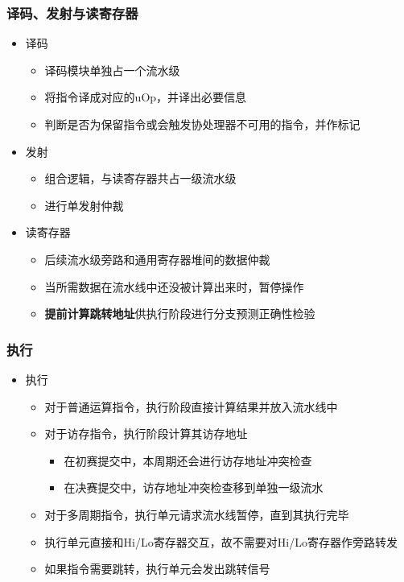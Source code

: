 \documentclass{beamer}
\begin{document}
\begin{frame}
    \frametitle{译码、发射与读寄存器}
    \begin{itemize}
        \item 译码\begin{itemize}
            \item 译码模块单独占一个流水级
            \item 将指令译成对应的uOp，并译出必要信息
            \item 判断是否为保留指令或会触发协处理器不可用的指令，并作标记
        \end{itemize}
        \item 发射\begin{itemize}
            \item 组合逻辑，与读寄存器共占一级流水级
            \item 进行单发射仲裁
        \end{itemize}
        \item 读寄存器\begin{itemize}
            \item 后续流水级旁路和通用寄存器堆间的数据仲裁
            \item 当所需数据在流水线中还没被计算出来时，暂停操作
            \item \textbf{提前计算跳转地址}供执行阶段进行分支预测正确性检验
        \end{itemize}
    \end{itemize}
\end{frame}

\begin{frame}
    \frametitle{执行}
    \begin{itemize}
        \item 执行\begin{itemize}
            \item 对于普通运算指令，执行阶段直接计算结果并放入流水线中
            \item 对于访存指令，执行阶段计算其访存地址\begin{itemize}
                \item 在初赛提交中，本周期还会进行访存地址冲突检查
                \item 在决赛提交中，访存地址冲突检查移到单独一级流水
            \end{itemize}
            \item 对于多周期指令，执行单元请求流水线暂停，直到其执行完毕
            \item 执行单元直接和Hi/Lo寄存器交互，故不需要对Hi/Lo寄存器作旁路转发
            \item 如果指令需要跳转，执行单元会发出跳转信号
        \end{itemize}
    \end{itemize}
\end{frame}
\end{document}
